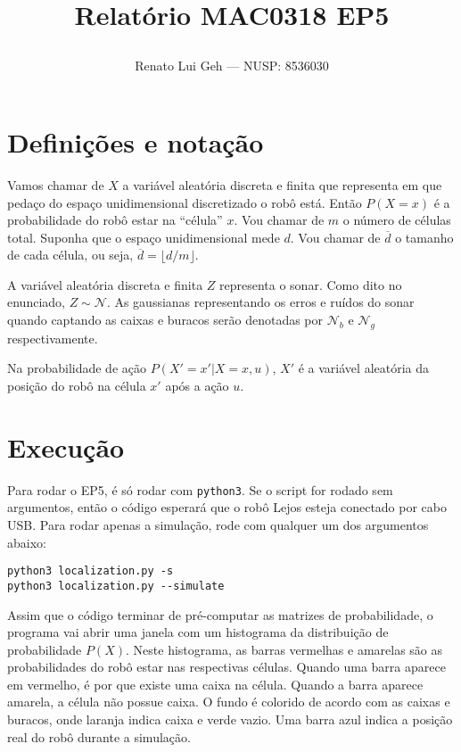 \documentclass[12pt]{article}
\title{%
  \textbf{Relatório MAC0318 EP5}\\
  \author{Renato Lui Geh --- NUSP\@: 8536030}
}
\date{}
\newcommand{\ov}{\overline}
\theoremstyle{plain}
\numberwithin{equation}{section}
\newcommand{\code}[1]{\lstinline[mathescape=true]{#1}}
\begin{document}
\maketitle

\section{Definições e notação}

Vamos chamar de $X$ a variável aleatória discreta e finita que representa em que pedaço do espaço
unidimensional discretizado o robô está. Então $P(X=x)$ é a probabilidade do robô estar na
``célula'' $x$. Vou chamar de $m$ o número de células total. Suponha que o espaço unidimensional
mede $d$. Vou chamar de $\ov{d}$ o tamanho de cada célula, ou seja, $\ov{d}=\lfloor d/m\rfloor$.

A variável aleatória discreta e finita $Z$ representa o sonar. Como dito no enunciado,
$Z\sim\mathcal{N}$. As gaussianas representando os erros e ruídos do sonar quando captando as
caixas e buracos serão denotadas por $\mathcal{N}_b$ e $\mathcal{N}_g$ respectivamente.

Na probabilidade de ação $P(X'=x'|X=x,u)$, $X'$ é a variável aleatória da posição do robô na célula
$x'$ após a ação $u$.

\section{Execução}

Para rodar o EP5, é só rodar com \code{python3}. Se o script for rodado sem argumentos, então o
código esperará que o robô Lejos esteja conectado por cabo USB\@. Para rodar apenas a simulação, rode
com qualquer um dos argumentos abaixo:\\

\begin{lstlisting}
python3 localization.py -s
python3 localization.py --simulate
\end{lstlisting}

Assim que o código terminar de pré-computar as matrizes de probabilidade, o programa vai abrir uma
janela com um histograma da distribuição de probabilidade $P(X)$. Neste histograma, as barras
vermelhas e amarelas são as probabilidades do robô estar nas respectivas células. Quando uma barra
aparece em vermelho, é por que existe uma caixa na célula. Quando a barra aparece amarela, a célula
não possue caixa. O fundo é colorido de acordo com as caixas e buracos, onde laranja indica caixa e
verde vazio. Uma barra azul indica a posição real do robô durante a simulação.
\end{document}
